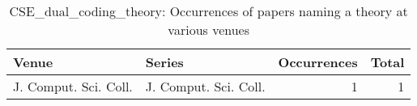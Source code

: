 \begin{table*}[t]
\begin{tabular}{llrr}
Venue & Series & Occurrences & Total\\\hline
\multirow{1}{*}{J. Comput. Sci. Coll.} & J. Comput. Sci. Coll. & 1 & \multirow{1}{*}{1}\\
\end{tabular}
\caption{CSE\_dual\_coding\_theory: Occurrences of papers naming a theory at various venues}
\end{table*}